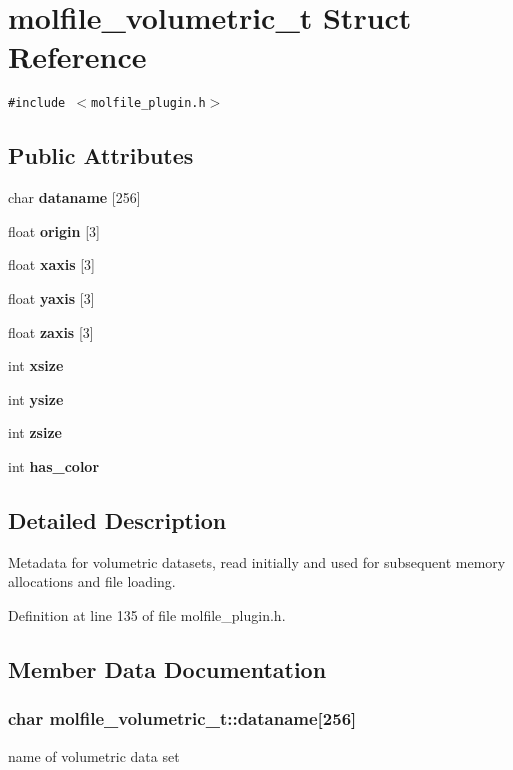 \section{molfile\_\-volumetric\_\-t  Struct Reference}
\label{structmolfile__volumetric__t}
{\tt \#include $<$molfile\_\-plugin.h$>$}

\subsection*{Public Attributes}
\begin{CompactItemize}
\item 
char {\bf dataname} [256]
\item 
float {\bf origin} [3]
\item 
float {\bf xaxis} [3]
\item 
float {\bf yaxis} [3]
\item 
float {\bf zaxis} [3]
\item 
int {\bf xsize}
\item 
int {\bf ysize}
\item 
int {\bf zsize}
\item 
int {\bf has\_\-color}
\end{CompactItemize}


\subsection{Detailed Description}
Metadata for volumetric datasets, read initially and used for subsequent memory allocations and file loading. 



Definition at line 135 of file molfile\_\-plugin.h.

\subsection{Member Data Documentation}
\subsubsection{\setlength{\rightskip}{0pt plus 5cm}char molfile\_\-volumetric\_\-t::dataname[256]}\label{structmolfile__volumetric__t_m0}


name of volumetric data set 

